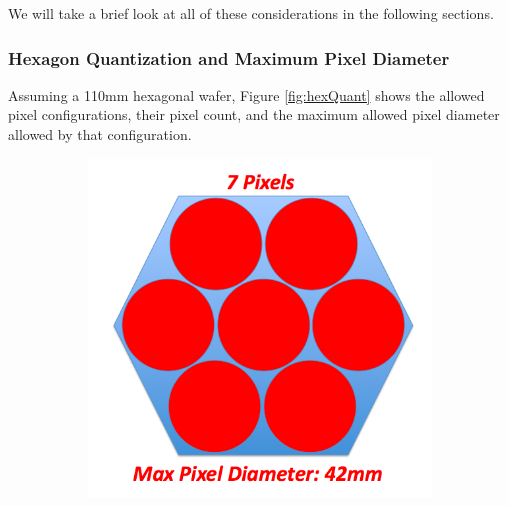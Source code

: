 \documentclass[12pt, titlepage]{article} %
\begin{document}
We will take a brief look at all of these considerations in the following sections.


\subsubsection{Hexagon Quantization and Maximum Pixel Diameter}

Assuming a 110mm hexagonal wafer, Figure \ref{fig:hexQuant} shows the allowed pixel configurations, their pixel count, and the maximum allowed pixel diameter allowed by that configuration.

\begin{figure}[H]
	\centering
	
	\begin{subfigure}{0.3\textwidth}
		\centering
		\includegraphics[width=\linewidth]{PNG/7pixels}
	\end{subfigure}%
	\begin{subfigure}{0.3\textwidth}
		\centering

\end{subfigure}
\end{figure}
\end{document}
